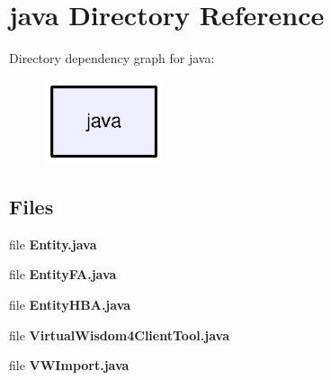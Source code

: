 \section{java Directory Reference}
\label{dir_93c6ba7fb77bae0709fae89c9c13b44a}
Directory dependency graph for java\+:\nopagebreak
\begin{figure}[H]
\begin{center}
\leavevmode
\includegraphics[width=98pt]{dir_93c6ba7fb77bae0709fae89c9c13b44a_dep}
\end{center}
\end{figure}
\subsection*{Files}
\begin{DoxyCompactItemize}
\item 
file {\bf Entity.\+java}
\item 
file {\bf Entity\+F\+A.\+java}
\item 
file {\bf Entity\+H\+B\+A.\+java}
\item 
file {\bf Virtual\+Wisdom4\+Client\+Tool.\+java}
\item 
file {\bf V\+W\+Import.\+java}
\end{DoxyCompactItemize}
